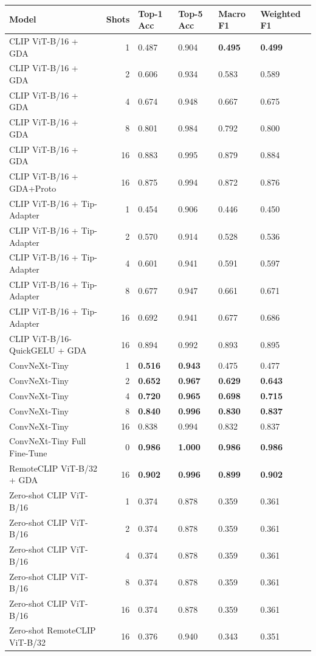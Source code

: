 \begin{tabular}{lrllll}
\toprule
Model & Shots & Top-1 Acc & Top-5 Acc & Macro F1 & Weighted F1 \\
\midrule
CLIP ViT-B/16 + GDA & 1 & 0.487 & 0.904 & \textbf{0.495} & \textbf{0.499} \\
CLIP ViT-B/16 + GDA & 2 & 0.606 & 0.934 & 0.583 & 0.589 \\
CLIP ViT-B/16 + GDA & 4 & 0.674 & 0.948 & 0.667 & 0.675 \\
CLIP ViT-B/16 + GDA & 8 & 0.801 & 0.984 & 0.792 & 0.800 \\
CLIP ViT-B/16 + GDA & 16 & 0.883 & 0.995 & 0.879 & 0.884 \\
CLIP ViT-B/16 + GDA+Proto & 16 & 0.875 & 0.994 & 0.872 & 0.876 \\
CLIP ViT-B/16 + Tip-Adapter & 1 & 0.454 & 0.906 & 0.446 & 0.450 \\
CLIP ViT-B/16 + Tip-Adapter & 2 & 0.570 & 0.914 & 0.528 & 0.536 \\
CLIP ViT-B/16 + Tip-Adapter & 4 & 0.601 & 0.941 & 0.591 & 0.597 \\
CLIP ViT-B/16 + Tip-Adapter & 8 & 0.677 & 0.947 & 0.661 & 0.671 \\
CLIP ViT-B/16 + Tip-Adapter & 16 & 0.692 & 0.941 & 0.677 & 0.686 \\
CLIP ViT-B/16-QuickGELU + GDA & 16 & 0.894 & 0.992 & 0.893 & 0.895 \\
ConvNeXt-Tiny & 1 & \textbf{0.516} & \textbf{0.943} & 0.475 & 0.477 \\
ConvNeXt-Tiny & 2 & \textbf{0.652} & \textbf{0.967} & \textbf{0.629} & \textbf{0.643} \\
ConvNeXt-Tiny & 4 & \textbf{0.720} & \textbf{0.965} & \textbf{0.698} & \textbf{0.715} \\
ConvNeXt-Tiny & 8 & \textbf{0.840} & \textbf{0.996} & \textbf{0.830} & \textbf{0.837} \\
ConvNeXt-Tiny & 16 & 0.838 & 0.994 & 0.832 & 0.837 \\
ConvNeXt-Tiny Full Fine-Tune & 0 & \textbf{0.986} & \textbf{1.000} & \textbf{0.986} & \textbf{0.986} \\
RemoteCLIP ViT-B/32 + GDA & 16 & \textbf{0.902} & \textbf{0.996} & \textbf{0.899} & \textbf{0.902} \\
Zero-shot CLIP ViT-B/16 & 1 & 0.374 & 0.878 & 0.359 & 0.361 \\
Zero-shot CLIP ViT-B/16 & 2 & 0.374 & 0.878 & 0.359 & 0.361 \\
Zero-shot CLIP ViT-B/16 & 4 & 0.374 & 0.878 & 0.359 & 0.361 \\
Zero-shot CLIP ViT-B/16 & 8 & 0.374 & 0.878 & 0.359 & 0.361 \\
Zero-shot CLIP ViT-B/16 & 16 & 0.374 & 0.878 & 0.359 & 0.361 \\
Zero-shot RemoteCLIP ViT-B/32 & 16 & 0.376 & 0.940 & 0.343 & 0.351 \\
\bottomrule
\end{tabular}
